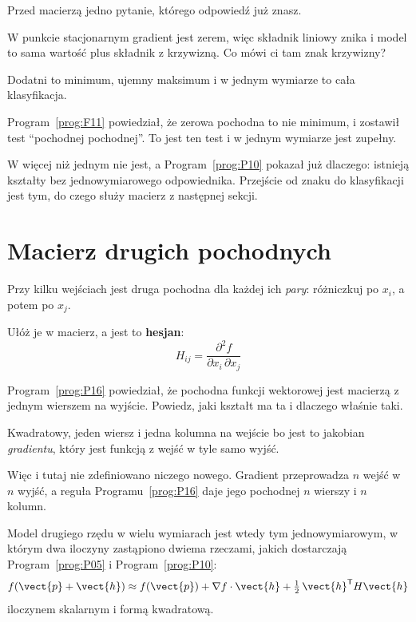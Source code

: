 \begin{fr}
Przed macierzą jedno pytanie, którego odpowiedź już znasz.

W punkcie stacjonarnym gradient jest zerem, więc składnik liniowy znika i
model to sama wartość plus składnik z krzywizną. Co mówi ci tam znak
krzywizny?
\nextframe
\end{fr}

\begin{fr}
\begin{ansblock}
Dodatni to minimum, ujemny maksimum \dash{} i w jednym wymiarze to cała
klasyfikacja.
\end{ansblock}

Program~\ref{prog:F11} powiedział, że zerowa pochodna to nie minimum, i
zostawił test \enquote{pochodnej pochodnej}. To jest ten test i w jednym
wymiarze jest zupełny.

W więcej niż jednym nie jest, a Program~\ref{prog:P10} pokazał już dlaczego:
istnieją kształty bez jednowymiarowego odpowiednika. Przejście od znaku do
klasyfikacji jest tym, do czego służy macierz z następnej sekcji.
\end{fr}

\section{Macierz drugich pochodnych}
\label{sec:P17-hessian}

\begin{fr}
Przy kilku wejściach jest druga pochodna dla każdej ich \emph{pary}: różniczkuj
po $x_i$, a potem po $x_j$.

Ułóż je w macierz, a jest to \textbf{hesjan}:
\[ H_{ij} = \frac{\partial^{2} f}{\partial x_i \, \partial x_j} \]

Program~\ref{prog:P16} powiedział, że pochodna funkcji wektorowej jest
macierzą z jednym wierszem na wyjście. Powiedz, jaki kształt ma ta i dlaczego
właśnie taki.
\dotline
\nextframe
\end{fr}

\begin{fr}
\begin{ansblock}
Kwadratowy, jeden wiersz i jedna kolumna na wejście \dash{} bo jest to
jakobian \emph{gradientu}, który jest funkcją z wejść w tyle samo wyjść.
\end{ansblock}

Więc i tutaj nie zdefiniowano niczego nowego. Gradient przeprowadza $n$ wejść
w $n$ wyjść, a reguła Programu~\ref{prog:P16} daje jego pochodnej $n$ wierszy
i $n$ kolumn.

Model drugiego rzędu w wielu wymiarach jest wtedy tym jednowymiarowym, w
którym dwa iloczyny zastąpiono dwiema rzeczami, jakich dostarczają
Program~\ref{prog:P05} i Program~\ref{prog:P10}:
\[ f(\vect{p} + \vect{h}) \approx f(\vect{p})
   + \nabla f \cdot \vect{h}
   + \tfrac{1}{2}\, \vect{h}^{\mathsf{T}} H \vect{h} \]
iloczynem skalarnym i formą kwadratową.
\end{fr}


